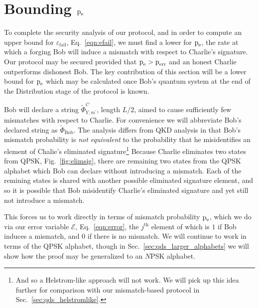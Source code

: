 \section{Bounding $\text{p}_{\text{e}}$}\label{sec:qds_bounding_pe}
To complete the security analysis of our protocol, and in order to compute an upper bound for $\varepsilon_{\text{fail}}$, Eq.~\ref{eqn:efail}, we must find a lower for $\text{p}_{\text{e}}$, the rate at which a forging Bob will induce a mismatch with respect to Charlie's signature. Our protocol may be secured provided that $\text{p}_{\text{e}} > \text{p}_{\text{err}}$ and an honest Charlie outperforms dishonest Bob. The key contribution of this section will be a lower bound for $\text{p}_{\text{e}}$ which may be calculated once Bob's quantum system at the end of the Distribution stage of the protocol is known.




Bob will declare a string $\tilde{\Phi}_{Y, m^\prime}^C$, length $L/2$,  aimed to cause sufficiently few mismatches with respect to Charlie. For convenience we will abbreviate Bob's declared string as $\tilde{\Phi}_{\text{Bob}}$. %
The analysis differs from QKD analysis in that Bob's mismatch probability is \emph{not equivalent} to the probability that he misidentifies an element of Chalie's eliminated signature\footnote{And so a Helstrom-like approach  will not work. We will pick up this idea further for comparison with our mismatch-based protocol in Sec.~\ref{sec:qds_helstromlike}.} Because Charlie eliminates two states from QPSK, Fig.~\ref{fig:elimsig}, there are remaining two states from the QPSK alphabet which Bob can declare without introducing a mismatch. Each of the remining states is shared with another possible eliminated signature element, and so it is possible that Bob misidentify Charlie's eliminated signature and yet still not introduce a mismatch.

This forces us to work directly in terms of mismatch probability $\text{p}_{\text{e}}$, which we do via our error variable $\mathcal{E}$, Eq.~\ref{eqn:error}, the $j^{\text{th}}$ element of which is $1$ if Bob induces a mismatch, and $0$ if there is no mismatch. We will continue to work in terms of the QPSK alphabet, though in Sec.~\ref{sec:qds_larger_alphabets} we will show how the proof may be generalized to an $N$PSK alphabet.

